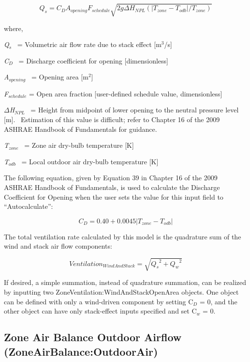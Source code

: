 \begin{equation}
{Q_s} = {C_D}{A_{opening}}{F_{schedule}}\sqrt {2g\Delta {H_{NPL}}(|{T_{zone}} - {T_{odb}}|/{T_{zone}})}
\end{equation}

where,

\emph{Q\(_{s}\)}~ = Volumetric air flow rate due to stack effect {[}m\(^{3}\)/s{]}

\emph{C\(_{D}\)}~ = Discharge coefficient for opening {[}dimensionless{]}

\emph{A\(_{opening}\)}~ = Opening area {[}m\(^{2}\){]}

\emph{F\(_{schedule}\)} = Open area fraction {[}user-defined schedule value, dimensionless{]}

\emph{$\Delta$H\(_{NPL}\)}~ = Height from midpoint of lower opening to the neutral pressure level {[}m{]}.~ Estimation of this value is difficult; refer to Chapter 16 of the 2009 ASHRAE Handbook of Fundamentals for guidance.

\emph{T\(_{zone}\)}~ = Zone air dry-bulb temperature {[}K{]}

\emph{T\(_{odb}\)}~ = Local outdoor air dry-bulb temperature {[}K{]}

The following equation, given by Equation 39 in Chapter 16 of the 2009 ASHRAE Handbook of Fundamentals, is used to calculate the Discharge Coefficient for Opening when the user sets the value for this input field to ``Autocalculate'':

\begin{equation}
{C_D} = 0.40 + 0.0045\left| {{T_{zone}} - {T_{odb}}} \right|
\end{equation}

The total ventilation rate calculated by this model is the quadrature sum of the wind and stack air flow components:

\begin{equation}
Ventilatio{n_{WindAndStack}} = \sqrt {{Q_s}^2 + {Q_w}^2}
\end{equation}

If desired, a simple summation, instead of quadrature summation, can be realized by inputting two ZoneVentilation:WindAndStackOpenArea objects. One object can be defined with only a wind-driven component by setting C\(_{D}\) = 0, and the other object can have only stack-effect inputs specified and set C\(_{w}\) = 0.

\subsection{Zone Air Balance Outdoor Airflow (ZoneAirBalance:OutdoorAir)}\label{zone-air-balance-outdoor-airflow-zoneairbalanceoutdoorair}

